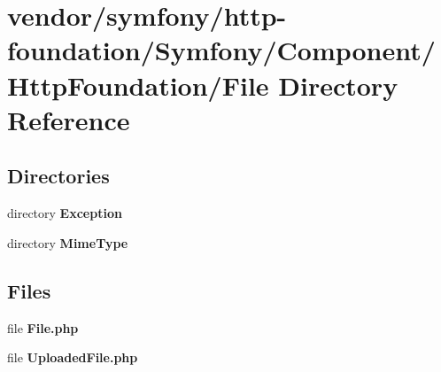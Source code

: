 \section{vendor/symfony/http-\/foundation/\+Symfony/\+Component/\+Http\+Foundation/\+File Directory Reference}
\label{dir_d5f4c4a5b7d0df8ad036895aed58a53f}
\subsection*{Directories}
\begin{DoxyCompactItemize}
\item 
directory {\bf Exception}
\item 
directory {\bf Mime\+Type}
\end{DoxyCompactItemize}
\subsection*{Files}
\begin{DoxyCompactItemize}
\item 
file {\bf File.\+php}
\item 
file {\bf Uploaded\+File.\+php}
\end{DoxyCompactItemize}
